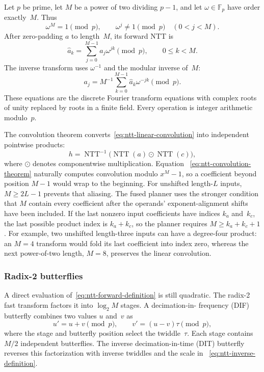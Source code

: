 Let $p$ be prime, let $M$ be a power of two dividing $p-1$, and let
$\omega\in\mathbb{F}_p$ have order exactly~$M$.  Thus
\begin{equation}
  \omega^M=1\pmod p,
  \qquad
  \omega^j\ne 1\pmod p\quad(0<j<M).
  \label{eq:ntt-primitive-root}
\end{equation}
After zero-padding $a$ to length~$M$, its forward NTT is
\begin{equation}
  \widehat a_k = \sum_{j=0}^{M-1} a_j\omega^{jk}\pmod p,
  \qquad 0\le k<M.
  \label{eq:ntt-forward-definition}
\end{equation}
The inverse transform uses $\omega^{-1}$ and the modular inverse of~$M$:
\begin{equation}
  a_j = M^{-1}\sum_{k=0}^{M-1}\widehat a_k\omega^{-jk}\pmod p.
  \label{eq:ntt-inverse-definition}
\end{equation}
These equations are the discrete Fourier transform equations with complex roots
of unity replaced by roots in a finite field.  Every operation is integer
arithmetic modulo~$p$.

The convolution theorem converts~\eqref{eq:ntt-linear-convolution} into
independent pointwise products:
\begin{equation}
  h = \operatorname{NTT}^{-1}
      \bigl(\operatorname{NTT}(a)\odot\operatorname{NTT}(c)\bigr),
  \label{eq:ntt-convolution-theorem}
\end{equation}
where $\odot$ denotes componentwise multiplication.  Equation
~\eqref{eq:ntt-convolution-theorem} naturally computes convolution modulo
$x^M-1$, so a coefficient beyond position $M-1$ would wrap to the beginning.
For unshifted length-$L$ inputs, $M\ge 2L-1$ prevents that aliasing.  The fused
planner uses the stronger condition that $M$ contain every coefficient after
the operands' exponent-alignment shifts have been included.  If the last
nonzero input coefficients have indices $k_a$ and~$k_c$, the last possible
product index is $k_a+k_c$, so the planner requires $M\ge k_a+k_c+1$.
For example, two unshifted length-three inputs can have a degree-four product:
an $M=4$ transform would fold its last coefficient into index zero, whereas
the next power-of-two length, $M=8$, preserves the linear convolution.

\subsubsection{Radix-2 butterflies}

A direct evaluation of~\eqref{eq:ntt-forward-definition} is still quadratic.
The radix-2 fast transform factors it into $\log_2 M$ stages.  A decimation-in-
frequency (DIF) butterfly combines two values $u$ and~$v$ as
\begin{equation}
  u' = u+v\pmod p,
  \qquad
  v' = (u-v)\tau\pmod p,
  \label{eq:ntt-dif-butterfly}
\end{equation}
where the stage and butterfly position select the twiddle~$\tau$.  Each stage
contains $M/2$ independent butterflies.  The inverse decimation-in-time (DIT)
butterfly reverses this factorization with inverse twiddles and the scale in
~\eqref{eq:ntt-inverse-definition}.


